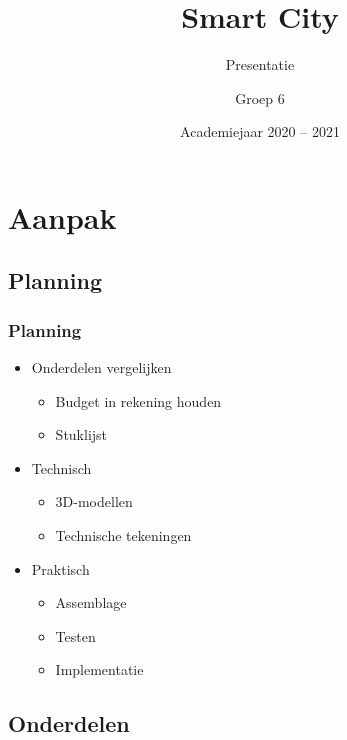 \documentclass[aspectratio=169,kulak,t]{kulakbeamer} %
\title[Beamer]{Smart City}
\subtitle{Presentatie}
\author[Groep 6]{Groep 6}
\institute[Kulak]{KU Leuven Kulak}
\date{Academiejaar 2020 -- 2021}
\begin{document}
	
	\begin{titleframe}
		\titlepage
	\end{titleframe}
	
	\begin{outlineframe}[Overzicht]
		\tableofcontents
	\end{outlineframe}

\section{Aanpak}


\subsection{Planning}
\begin{frame}
	\frametitle{Planning}
	\begin{itemize}
		\item Onderdelen vergelijken
		\begin{itemize}
			\item Budget in rekening houden
			\item Stuklijst
		\end{itemize}
		\item Technisch
		\begin{itemize}
			\item 3D-modellen
			\item Technische tekeningen
		\end{itemize}
		\item Praktisch
		\begin{itemize}
			\item Assemblage
			\item Testen
			\item Implementatie
		\end{itemize}
	\end{itemize}
	
\end{frame}

\subsection{Onderdelen}
\end{document}
